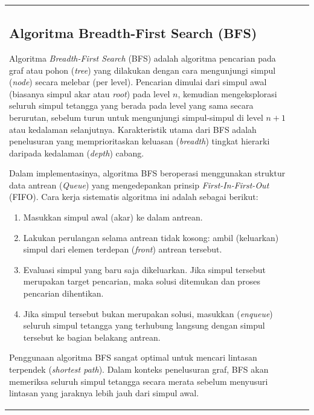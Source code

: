 \documentclass[12pt]{article}
\begin{document}
\begin{table}[H]
\begin{tabular}{|l|c|c|}
\begin{document}
\subsection{Algoritma Breadth-First Search (BFS)}

Algoritma \textit{Breadth-First Search} (BFS) adalah algoritma pencarian pada graf atau pohon (\textit{tree}) yang dilakukan dengan cara mengunjungi simpul (\textit{node}) secara melebar (per level). Pencarian dimulai dari simpul awal (biasanya simpul akar atau \textit{root}) pada level $n$, kemudian mengeksplorasi seluruh simpul tetangga yang berada pada level yang sama secara berurutan, sebelum turun untuk mengunjungi simpul-simpul di level $n+1$ atau kedalaman selanjutnya. Karakteristik utama dari BFS adalah penelusuran yang memprioritaskan keluasan (\textit{breadth}) tingkat hierarki daripada kedalaman (\textit{depth}) cabang.

Dalam implementasinya, algoritma BFS beroperasi menggunakan struktur data antrean (\textit{Queue}) yang mengedepankan prinsip \textit{First-In-First-Out} (FIFO). Cara kerja sistematis algoritma ini adalah sebagai berikut:
\begin{enumerate}
    \item Masukkan simpul awal (akar) ke dalam antrean.
    \item Lakukan perulangan selama antrean tidak kosong: ambil (keluarkan) simpul dari elemen terdepan (\textit{front}) antrean tersebut.
    \item Evaluasi simpul yang baru saja dikeluarkan. Jika simpul tersebut merupakan target pencarian, maka solusi ditemukan dan proses pencarian dihentikan.
    \item Jika simpul tersebut bukan merupakan solusi, masukkan (\textit{enqueue}) seluruh simpul tetangga yang terhubung langsung dengan simpul tersebut ke bagian belakang antrean.
\end{enumerate}

Penggunaan algoritma BFS sangat optimal untuk mencari lintasan terpendek (\textit{shortest path}). Dalam konteks penelusuran graf, BFS akan memeriksa seluruh simpul tetangga secara merata sebelum menyusuri lintasan yang jaraknya lebih jauh dari simpul awal.


\end{document}
\end{tabular}
\end{table}
\end{document}
